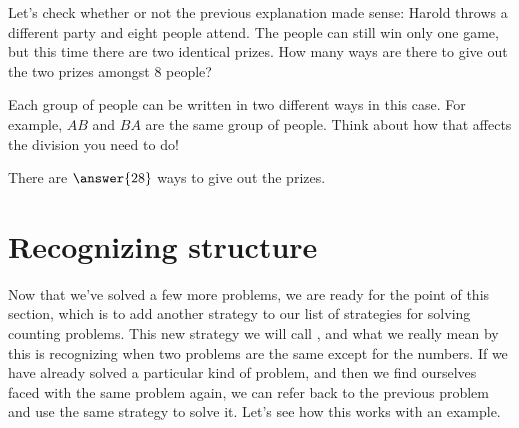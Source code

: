 \documentclass{ximera}
\begin{document}
\begin{question}
Let's check whether or not the previous explanation made sense: Harold throws a different party and eight people attend. The people can still win only one game, but this time there are two identical prizes. How many ways are there to give out the two prizes amongst $8$ people?

\begin{prompt}
\begin{hint}
Each group of people can be written in two different ways in this case. For example, $AB$ and $BA$ are the same group of people. Think about how that affects the division you need to do!
\end{hint}
There are $\answer{28}$ ways to give out the prizes.

\end{prompt}
\end{question}




\section{Recognizing structure}

Now that we've solved a few more problems, we are ready for the point of this section, which is to add another strategy to our list of strategies for solving counting problems. This new strategy we will call , and what we really mean by this is recognizing when two problems are the same except for the numbers. If we have already solved a particular kind of problem, and then we find ourselves faced with the same problem again, we can refer back to the previous problem and use the same strategy to solve it. Let's see how this works with an example.
\end{document}
